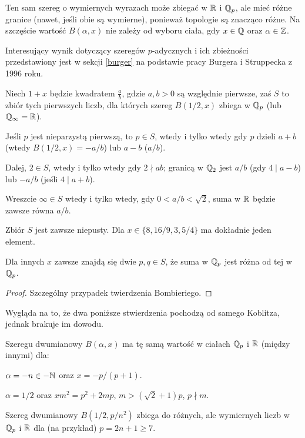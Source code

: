 Ten sam szereg o wymiernych wyrazach może zbiegać w $\mathbb R$ i $\mathbb Q_p$, ale mieć różne granice (nawet, jeśli obie są wymierne), ponieważ topologie są znacząco różne.
Na szczęście wartość $B(\alpha, x)$ nie zależy od wyboru ciała, gdy $x \in \mathbb Q$ oraz $\alpha \in \mathbb Z$.

Interesujący wynik dotyczący szeregów $p$-adycznych i ich zbieżności przedstawiony jest w sekcji \ref{burger} na podstawie pracy Burgera i Struppecka z 1996 roku.


\begin{fakt}
	Niech $1+x$ będzie kwadratem $\frac ab$, gdzie $a, b > 0$ są względnie pierwsze, zaś $S$ to zbiór tych pierwszych liczb, dla których szereg $B(1/2,x)$ zbiega w $\mathbb Q_p$ (lub $\mathbb Q_\infty = \mathbb R$).
	\begin{enumx}
		\item Jeśli $p$ jest nieparzystą pierwszą, to $p \in S$, wtedy i tylko wtedy gdy $p$ dzieli $a+b$ (wtedy $B(1/2,x) = -a/b$) lub $a-b$ ($a/b$).
		\item Dalej, $2 \in S$, wtedy i tylko wtedy gdy $2 \nmid ab$; granicą w $\mathbb Q_2$ jest $a/b$ (gdy $4 \mid a - b$) lub $-a/b$ (jeśli $4 \mid a + b$).
		\item Wreszcie $\infty \in S$ wtedy i tylko wtedy, gdy $0 < a/b < \sqrt{2}$, suma w $\mathbb R$ będzie zawsze równa $a/b$.
		\item Zbiór $S$ jest zawsze niepusty.
		Dla $x \in \{8, 16/9, 3, 5/4\}$ ma dokładnie jeden element.
		\item Dla innych $x$ zawsze znajdą się dwie $p, q \in S$, że suma w $\mathbb Q_p$ jest różna od tej w $\mathbb Q_p$.
	\end{enumx}
\end{fakt}

\begin{proof}
	Szczególny przypadek twierdzenia Bombieriego.
\end{proof}

Wygląda na to, że dwa poniższe stwierdzenia pochodzą od samego Koblitza, jednak brakuje im dowodu.

\begin{fakt}
	Szeregu dwumianowy $B(\alpha, x)$ ma tę samą wartość w ciałach $\mathbb Q_p$ i $\mathbb R$ (między innymi) dla:
	\begin{itemx}
	\item $\alpha = -n \in - \mathbb N$ oraz $x = -p / (p+1)$.
	\item $\alpha = 1/2$ oraz $xm^2 = p^2 + 2mp$, $m > (\sqrt 2 + 1)p$, $p \nmid m$.
	\end{itemx}
\end{fakt}

\begin{fakt}
	Szereg dwumianowy $B(1/2, p/n^2)$ zbiega do różnych, ale wymiernych liczb w $\mathbb Q_p$ i $\mathbb R$ dla (na przykład) $p = 2n+1 \ge 7$.
\end{fakt}